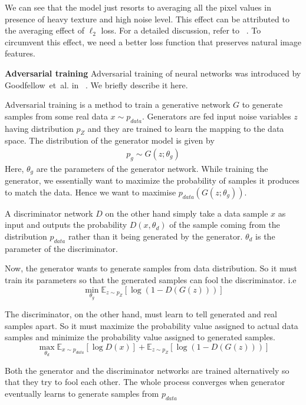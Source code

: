 \documentclass[10pt,twocolumn,letterpaper]{proc}
\begin{document}
We can see that the model just resorts to averaging all the pixel values in presence of heavy texture and high noise level. This effect can be attributed to the averaging effect of $\ell_2$ loss. For a detailed discussion, refer to ~\cite{mathieu2015deep}. To circumvent this effect, we need a better loss function that preserves natural image features. 

\textbf{Adversarial training}
Adversarial training of neural networks was introduced by  Goodfellow~et~al. in ~\cite{goodfellow2014generative}. We briefly describe it here.

Adversarial training is a method to train a generative network $G$ to generate samples from some real data $x\sim p_{data}$. Generators are fed input noise variables $z$ having distribution $p_Z$ and they are trained to learn the mapping to the data space. The distribution of the generator model is given by
\begin{align}
    p_g \sim G(z;\theta_g)
\end{align}
Here, $\theta_g$ are the parameters of the generator network. While training the generator, we essentially want to maximize the probability of samples it produces to match the data. Hence we want to maximise $p_{data}(G(z;\theta_g))$. 


A discriminator network $D$ on the other hand simply take a data sample $x$ as input and outputs the probability $D(x,\theta_d)$ of the sample coming from the distribution $p_{data}$ rather than it being generated by the generator. $\theta_d$ is the parameter of the discriminator.

Now, the generator wants to generate samples from data distribution. So it must train its parameters so that the generated samples can fool the discriminator. i.e
\begin{equation}
    \min_{\theta_g}\mathbb{E}_{z\sim p_Z}\left[\log\left(1-D(G(z))\right)\right]
\end{equation}

The discriminator, on the other hand, must learn to tell generated and real samples apart. So it must maximize the probability value assigned to actual data samples and minimize the probability value assigned to generated samples.
\begin{equation}
    \max_{\theta_d}\mathbb{E}_{x\sim p_{data}}\left[\log D(x)\right] + \mathbb{E}_{z\sim p_Z}\left[\log\left(1-D(G(z))\right)\right]
\end{equation}

Both the generator and the discriminator networks are trained alternatively so that they try to fool each other. The whole process converges when generator eventually learns to generate samples from $p_{data}$
\end{document}

